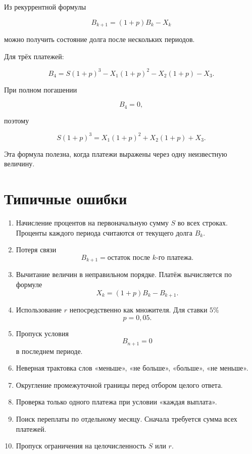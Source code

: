 \documentclass[a4paper,12pt]{article}
\begin{document}
Из рекуррентной формулы

\[
B_{k+1}=(1+p)B_k-X_k
\]

можно получить состояние долга после нескольких периодов.

Для трёх платежей:

\[
B_4
=
S(1+p)^3
-
X_1(1+p)^2
-
X_2(1+p)
-
X_3.
\]

При полном погашении

\[
B_4=0,
\]

поэтому

\[
\boxed{
S(1+p)^3
=
X_1(1+p)^2+
X_2(1+p)+X_3.
}
\]

Эта формула полезна, когда платежи выражены через одну неизвестную величину.


\section{Типичные ошибки}

\begin{enumerate}[leftmargin=1.8em,itemsep=0.55em]
    \item Начисление процентов на первоначальную сумму \(S\) во всех строках.
    Проценты каждого периода считаются от текущего долга \(B_k\).

    \item Потеря связи
    \[
    B_{k+1}=\text{остаток после }k\text{-го платежа}.
    \]

    \item Вычитание величин в неправильном порядке.
    Платёж вычисляется по формуле
    \[
    X_k=(1+p)B_k-B_{k+1}.
    \]

    \item Использование \(r\) непосредственно как множителя.
    Для ставки \(5\%\)
    \[
    p=0{,}05.
    \]

    \item Пропуск условия
    \[
    B_{n+1}=0
    \]
    в последнем периоде.

    \item Неверная трактовка слов
    «меньше», «не больше», «больше», «не меньше».

    \item Округление промежуточной границы перед отбором целого ответа.

    \item Проверка только одного платежа при условии
    «каждая выплата».

    \item Поиск переплаты по отдельному месяцу.
    Сначала требуется сумма всех платежей.

    \item Пропуск ограничения на целочисленность \(S\) или \(r\).
\end{enumerate}
\end{document}
